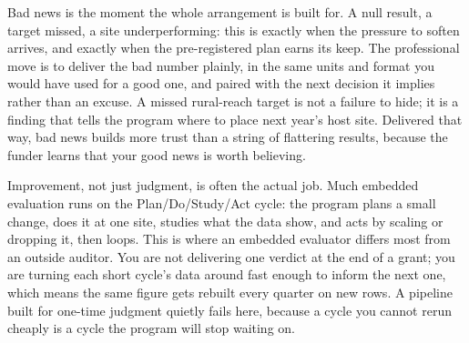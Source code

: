 \documentclass[
    a4paper,
    fontsize=10pt,
    twoside=true,
    numbers=noenddot,
]{kaobook}
\begin{document}
Bad news is the moment the whole arrangement is built for. A null result, a target missed, a site underperforming: this is exactly when the pressure to soften arrives, and exactly when the pre-registered plan earns its keep. The professional move is to deliver the bad number plainly, in the same units and format you would have used for a good one, and paired with the next decision it implies rather than an excuse. A missed rural-reach target is not a failure to hide; it is a finding that tells the program where to place next year's host site. Delivered that way, bad news builds more trust than a string of flattering results, because the funder learns that your good news is worth believing.

Improvement, not just judgment, is often the actual job. Much embedded evaluation runs on the Plan\slash Do\slash Study\slash Act cycle: the program plans a small change, does it at one site, studies what the data show, and acts by scaling or dropping it, then loops. This is where an embedded evaluator differs most from an outside auditor. You are not delivering one verdict at the end of a grant; you are turning each short cycle's data around fast enough to inform the next one, which means the same figure gets rebuilt every quarter on new rows. A pipeline built for one-time judgment quietly fails here, because a cycle you cannot rerun cheaply is a cycle the program will stop waiting on.
\end{document}
